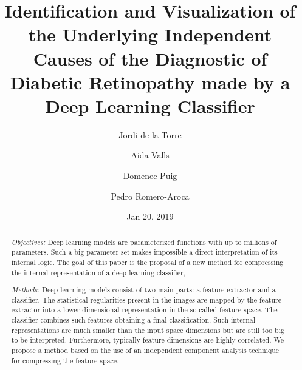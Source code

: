 \documentclass[review]{elsarticle}
\theoremstyle{definition} %
\theoremstyle{remark}
\begin{document}
\begin{frontmatter}

\title{Identification and Visualization of the Underlying Independent Causes of the Diagnostic of Diabetic Retinopathy made by a Deep Learning Classifier}

\author[label1]{Jordi de la Torre}
\address[label1]{Departament d'Enginyeria Inform\`atica i Matem\`atiques.\\Escola T\`ecnica Superior d'Enginyeria.\\Universitat Rovira i Virgili\\Avinguda Paisos Catalans, 26. E-43007\\
	Tarragona, Spain}
\author[label1]{Aida Valls}
\author[label1]{Domenec Puig}
\author[label2]{Pedro Romero-Aroca}





\address[label2]{Ophthalmic Service. University Hospital Sant Joan de Reus\\Institut d’Investigaci\'o Sanit\`aria Pere Virgili (IISPV)\\ Universitat Rovira i Virgili\\Reus (Tarragona)\\Avinguda de la Universitat, 1. E-43204\\Reus, Spain}

\date{Jan 20, 2019}

\begin{abstract}
\emph{Objectives:} Deep learning models are parameterized functions with up to millions of parameters. Such a big parameter set makes impossible a direct interpretation of its internal logic. The goal of this paper is the proposal of a new method for compressing the internal representation of a deep learning classifier, 
 
\emph{Methods:} Deep learning models consist of two main parts: a feature extractor and a classifier. The statistical regularities present in the images are mapped by the feature extractor into a lower dimensional representation in the so-called feature space. The classifier combines such features obtaining a final classification. Such internal representations are much smaller than the input space dimensions but are still too big to be interpreted. Furthermore, typically feature dimensions are highly correlated. We propose a method based on the use of an independent component analysis technique for compressing the feature-space. 


\end{abstract}
\end{frontmatter}
\end{document}

